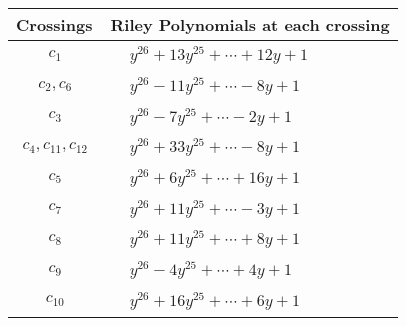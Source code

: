 \documentclass[1p]{elsarticle_modified}
\theoremstyle{definition}
\begin{document}
\begin{tabular}{m{50pt}|m{274pt}}
Crossings & \hspace{64pt}Riley Polynomials at each crossing \\
\hline $$\begin{aligned}c_{1}\end{aligned}$$&$\begin{aligned}
&y^{26}+13 y^{25}+\cdots+12 y+1
\end{aligned}$\\
\hline $$\begin{aligned}c_{2},c_{6}\end{aligned}$$&$\begin{aligned}
&y^{26}-11 y^{25}+\cdots-8 y+1
\end{aligned}$\\
\hline $$\begin{aligned}c_{3}\end{aligned}$$&$\begin{aligned}
&y^{26}-7 y^{25}+\cdots-2 y+1
\end{aligned}$\\
\hline $$\begin{aligned}c_{4},c_{11},c_{12}\end{aligned}$$&$\begin{aligned}
&y^{26}+33 y^{25}+\cdots-8 y+1
\end{aligned}$\\
\hline $$\begin{aligned}c_{5}\end{aligned}$$&$\begin{aligned}
&y^{26}+6 y^{25}+\cdots+16 y+1
\end{aligned}$\\
\hline $$\begin{aligned}c_{7}\end{aligned}$$&$\begin{aligned}
&y^{26}+11 y^{25}+\cdots-3 y+1
\end{aligned}$\\
\hline $$\begin{aligned}c_{8}\end{aligned}$$&$\begin{aligned}
&y^{26}+11 y^{25}+\cdots+8 y+1
\end{aligned}$\\
\hline $$\begin{aligned}c_{9}\end{aligned}$$&$\begin{aligned}
&y^{26}-4 y^{25}+\cdots+4 y+1
\end{aligned}$\\
\hline $$\begin{aligned}c_{10}\end{aligned}$$&$\begin{aligned}
&y^{26}+16 y^{25}+\cdots+6 y+1
\end{aligned}$\\
\hline
\end{tabular}\\~\\
\end{document}
